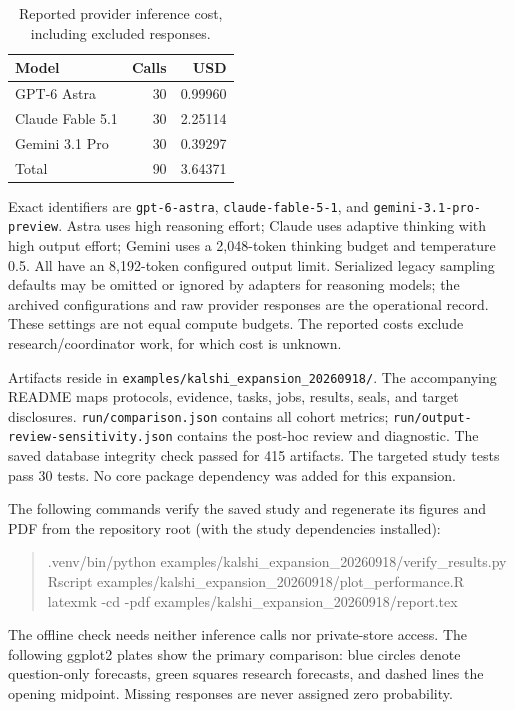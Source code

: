 \documentclass[11pt]{article}
\begin{document}
\begin{table}[htbp]
\centering
\caption{Reported provider inference cost, including excluded responses.}
\begin{tabular}{lrr}
\toprule
Model & Calls & USD\\
\midrule
GPT-6 Astra & 30 & 0.99960\\
Claude Fable 5.1 & 30 & 2.25114\\
Gemini 3.1 Pro & 30 & 0.39297\\
\midrule
Total & 90 & 3.64371\\
\bottomrule
\end{tabular}
\end{table}

Exact identifiers are \texttt{gpt-6-astra}, \texttt{claude-fable-5-1}, and
\texttt{gemini-3.1-pro-preview}. Astra uses high reasoning effort; Claude uses
adaptive thinking with high output effort; Gemini uses a 2,048-token thinking
budget and temperature 0.5. All have an 8,192-token configured output limit.
Serialized legacy sampling defaults may be omitted or ignored by adapters for
reasoning models; the archived configurations and raw provider responses are
the operational record. These settings are not equal compute budgets. The
reported costs exclude research/coordinator work, for which cost is unknown.

Artifacts reside in \texttt{examples/kalshi\_expansion\_20260918/}.
The accompanying README maps protocols, evidence, tasks, jobs, results, seals,
and target disclosures. \texttt{run/comparison.json} contains all cohort
metrics; \texttt{run/output-review-sensitivity.json} contains the post-hoc
review and diagnostic. The saved database integrity check passed for 415
artifacts. The targeted study tests pass 30 tests. No core package dependency
was added for this expansion.

The following commands verify the saved study and regenerate its figures and PDF
from the repository root (with the study dependencies installed):
\begin{quote}\small\ttfamily
.venv/bin/python examples/kalshi\_expansion\_20260918/verify\_results.py\\
Rscript examples/kalshi\_expansion\_20260918/plot\_performance.R\\
latexmk -cd -pdf examples/kalshi\_expansion\_20260918/report.tex
\end{quote}
The offline check needs neither inference calls nor private-store access.
The following ggplot2 plates show the primary comparison: blue circles denote
question-only forecasts, green squares research forecasts, and dashed lines the
opening midpoint. Missing responses are never assigned zero probability.
\clearpage

\end{document}
